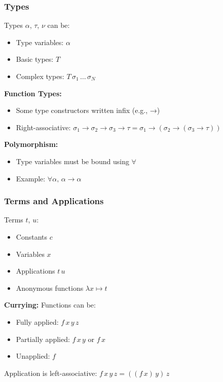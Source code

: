 \documentclass{beamer}
\begin{document}
\begin{frame}
  \frametitle{Types}
  
  Types $\alpha$, $\tau$, $\nu$ can be:
  
  \begin{itemize}
    \item Type variables: $\alpha$
    \item Basic types: $T$
    \item Complex types: $T\,\sigma_1\,\ldots\,\sigma_N$
  \end{itemize}
  
  \vspace{0.3cm}
  
  \textbf{Function Types:}
  \begin{itemize}
    \item Some type constructors written infix (e.g., →)
    \item Right-associative: $\sigma_1 \to \sigma_2 \to \sigma_3 \to \tau = \sigma_1 \to (\sigma_2 \to (\sigma_3 \to \tau))$
  \end{itemize}
  
  \vspace{0.3cm}
  
  \textbf{Polymorphism:}
  \begin{itemize}
    \item Type variables must be bound using $\forall$
    \item Example: $\forall \alpha,\, \alpha \to \alpha$
  \end{itemize}
\end{frame}

\begin{frame}
  \frametitle{Terms and Applications}
  
  Terms $t$, $u$:
  
  \begin{itemize}
    \item Constants $c$
    \item Variables $x$
    \item Applications $t\,u$
    \item Anonymous functions $\lambda x \mapsto t$
  \end{itemize}
  
  \vspace{0.3cm}
  
  \textbf{Currying:}
  Functions can be:
  \begin{itemize}
    \item Fully applied: $f\,x\,y\,z$
    \item Partially applied: $f\,x\,y$ or $f\,x$
    \item Unapplied: $f$
  \end{itemize}
  
  \vspace{0.3cm}
  
  Application is left-associative: $f\,x\,y\,z = ((f\,x)\,y)\,z$
\end{frame}
\end{document}
